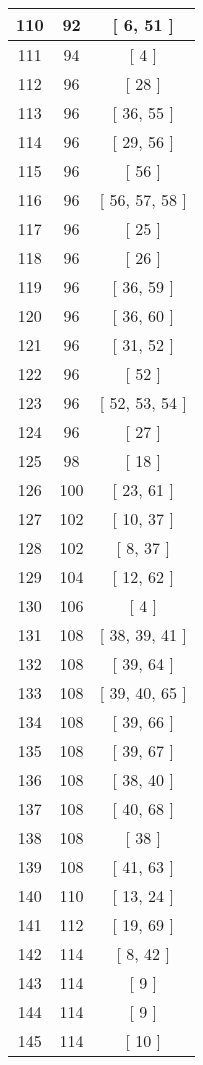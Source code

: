 \begin{center}
\begin{longtable}[H]{|| c c c ||}
\hline
110 & 92 & [ 6, 51 ] \\ 
\hline
111 & 94 & [ 4 ] \\ 
\hline
112 & 96 & [ 28 ] \\ 
\hline
113 & 96 & [ 36, 55 ] \\ 
\hline
114 & 96 & [ 29, 56 ] \\ 
\hline
115 & 96 & [ 56 ] \\ 
\hline
116 & 96 & [ 56, 57, 58 ] \\ 
\hline
117 & 96 & [ 25 ] \\ 
\hline
118 & 96 & [ 26 ] \\ 
\hline
119 & 96 & [ 36, 59 ] \\ 
\hline
120 & 96 & [ 36, 60 ] \\ 
\hline
121 & 96 & [ 31, 52 ] \\ 
\hline
122 & 96 & [ 52 ] \\ 
\hline
123 & 96 & [ 52, 53, 54 ] \\ 
\hline
124 & 96 & [ 27 ] \\ 
\hline
125 & 98 & [ 18 ] \\ 
\hline
126 & 100 & [ 23, 61 ] \\ 
\hline
127 & 102 & [ 10, 37 ] \\ 
\hline
128 & 102 & [ 8, 37 ] \\ 
\hline
129 & 104 & [ 12, 62 ] \\ 
\hline
130 & 106 & [ 4 ] \\ 
\hline
131 & 108 & [ 38, 39, 41 ] \\ 
\hline
132 & 108 & [ 39, 64 ] \\ 
\hline
133 & 108 & [ 39, 40, 65 ] \\ 
\hline
134 & 108 & [ 39, 66 ] \\ 
\hline
135 & 108 & [ 39, 67 ] \\ 
\hline
136 & 108 & [ 38, 40 ] \\ 
\hline
137 & 108 & [ 40, 68 ] \\ 
\hline
138 & 108 & [ 38 ] \\ 
\hline
139 & 108 & [ 41, 63 ] \\ 
\hline
140 & 110 & [ 13, 24 ] \\ 
\hline
141 & 112 & [ 19, 69 ] \\ 
\hline
142 & 114 & [ 8, 42 ] \\ 
\hline
143 & 114 & [ 9 ] \\ 
\hline
144 & 114 & [ 9 ] \\ 
\hline
145 & 114 & [ 10 ] \\ 

\end{longtable}
\end{center}
